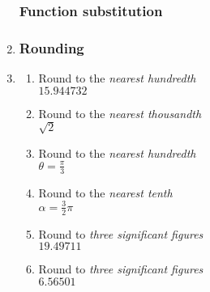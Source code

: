 \begin{enumerate}
\subsubsection*{Function substitution}
\item 
\begin{enumerate}[itemsep=2cm]
    \end{enumerate} \vspace{2cm}

\subsubsection*{Rounding}
\item
  \begin{multicols}{2}
  \begin{enumerate}[itemsep=1cm]
    \item Round to the \emph{nearest hundredth} \\[0.25cm] 
    $15.944732$
    \item Round to the \emph{nearest thousandth} \\[0.25cm]
    $\sqrt{2}$
    \item Round to the \emph{nearest hundredth} \\[0.25cm]
    $\displaystyle \theta=\frac{\pi}{3}$
    \item Round to the \emph{nearest tenth} \\[0.25cm]
    $\alpha=\frac{3}{2} \pi$  
    \item Round to \emph{three significant figures} \\[0.25cm]
    $19.49711$
    \item Round to \emph{three significant figures} \\[0.25cm]
    $6.56501$
  \end{enumerate}
  \end{multicols}


\end{enumerate}
